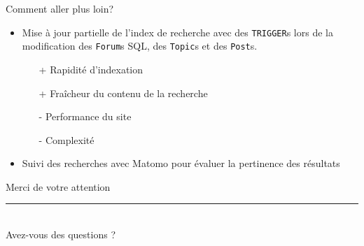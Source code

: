 \documentclass{beamer}
\begin{document}
\begin{frame}{Comment aller plus loin?}
    \begin{itemize}
        \item Mise à jour partielle de l'index de recherche avec des
            \texttt{TRIGGER}s lors de la modification des \texttt{Forum}s SQL,
            des \texttt{Topic}s et des \texttt{Post}s.
            \begin{itemize}
                \item [+] Rapidité d'indexation
                \item [+] Fraîcheur du contenu de la recherche
                \item [-] Performance du site
                \item [-] Complexité
            \end{itemize}
        \pause
        \item Suivi des recherches avec Matomo pour évaluer la pertinence des résultats
    \end{itemize}
\end{frame}

\begin{frame}[focus]
    Merci de votre attention
    \\
    \vspace{20pt}
    \rule{\textwidth}{1pt}
    \\
    \vspace{30pt}
    Avez-vous des questions ?
\end{frame}







\end{document}
